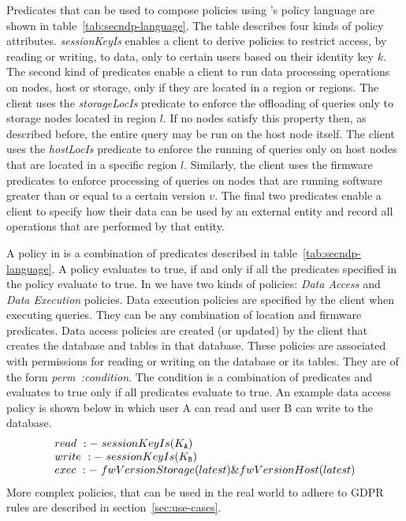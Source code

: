 Predicates that can be used to compose policies using \project{}'s policy language are shown in table~\ref{tab:secndp-language}. The table describes four kinds of policy attributes. \emph{sessionKeyIs} enables a client to derive policies to restrict access, by reading or writing, to data, only to certain users based on their identity key $k$. The second kind of predicates enable a client to run data processing operations on nodes, host or storage, only if they are located in a region or regions. The client uses the \emph{storageLocIs} predicate to enforce the offloading of queries only to storage nodes located in region $l$. If no nodes satisfy this property then, as described before, the entire query may be run on the host node itself. The client uses the \emph{hostLocIs} predicate to enforce the running of queries only on host nodes that are located in a specific region $l$. Similarly, the client uses the firmware predicates to enforce processing of queries on nodes that are running software greater than or equal to a certain version $v$. The final two predicates enable a client to specify how their data can be used by an external entity and record all operations that are performed by that entity.

A policy in \project{} is a combination of predicates described in table~\ref{tab:secndp-language}. A policy evaluates to true, if and only if all the predicates specified in the policy evaluate to true. In \project{} we have two kinds of policies: \emph{Data Access} and \emph{Data Execution} policies. Data execution policies are specified by the client when executing queries. They can be any combination of location and firmware predicates. Data access policies are created (or updated) by the client that creates the database and tables in that database. These policies are associated with permissions for reading or writing on the database or its tables. They are of the form \textit{perm~:condition}. The condition is a combination of predicates and evaluates to true only if all predicates evaluate to true. An example data access policy is shown below in which user A can read and user B can write to the database.
\[
\begin{array}{@{}l@{}}
read~:-~sessionKeyIs(K_{\tt A})\\
write~:-~sessionKeyIs(K_{\tt B})\\
exec~:-~fwVersionStorage(latest) \& fwVersionHost(latest)\\
\end{array}
\]
More complex policies, that can be used in the real world to adhere to GDPR rules are described in section~\ref{sec:use-cases}.